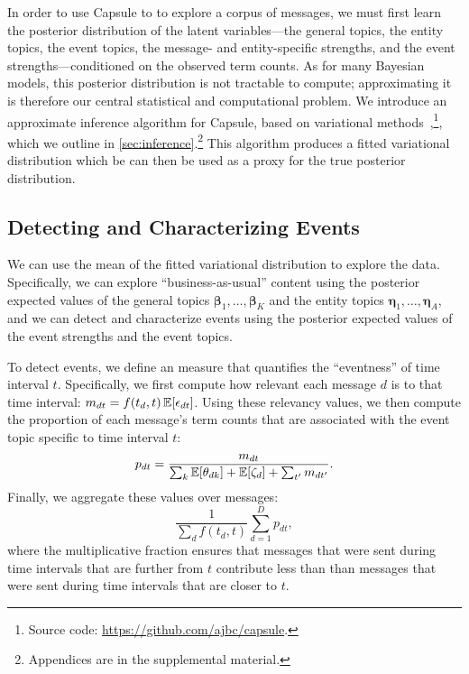 In order to use Capsule to to explore a corpus of messages, we must
first learn the posterior distribution of the latent variables---the
general topics, the entity topics, the event topics, the message- and
entity-specific strengths, and the event strengths---conditioned on
the observed term counts. As for many Bayesian models, this posterior
distribution is not tractable to compute; approximating it is
therefore our central statistical and computational problem. We
introduce an approximate inference algorithm for Capsule, based on
variational methods~\cite{Jordan:1999},\footnote{Source code:
  \url{https://github.com/ajbc/capsule}.}, which we outline in
\cref{sec:inference}.\footnote{Appendices are in the supplemental
  material.} This algorithm produces a fitted variational distribution
which be can then be used as a proxy for the true posterior
distribution.

\subsection{Detecting and Characterizing Events}
\label{sec:detecting}

We can use the mean of the fitted variational distribution to explore
the data. Specifically, we can explore ``business-as-usual'' content
using the posterior expected values of the general topics
$\mathbold{\beta}_1, \ldots, \mathbold{\beta}_K$ and the entity topics
$\mathbold{\eta}_1, \ldots, \mathbold{\eta}_A$, and we can detect and
characterize events using the posterior expected values of the event
strengths and the event topics.

To detect events, we define an measure that quantifies the
``eventness'' of time interval $t$. Specifically, we first compute how
relevant each message $d$ is to that time interval: $m_{dt} = f(t_d,
t)\,\mathbb{E}[\epsilon_{dt}]$. Using these relevancy values, we then compute
the proportion of each message's term counts that are associated with
the event topic specific to time interval $t$:
\begin{equation}
  p_{dt}= \frac{m_{dt}}{\sum_{k}
    \mathbb{E}[\theta_{dk}] + \mathbb{E}[\zeta_d] +
    \sum_{t'} m_{dt'}}.
\end{equation}
Finally, we aggregate these values over messages:
\begin{equation}
  \frac{1}{\sum_{d} f(t_d, t)}\sum_{d=1}^D p_{dt},
  \label{eq:eventness}
\end{equation}
where the multiplicative fraction ensures that messages that were sent
during time intervals that are further from $t$ contribute less than
than messages that were sent during time intervals that are closer to
$t$.

